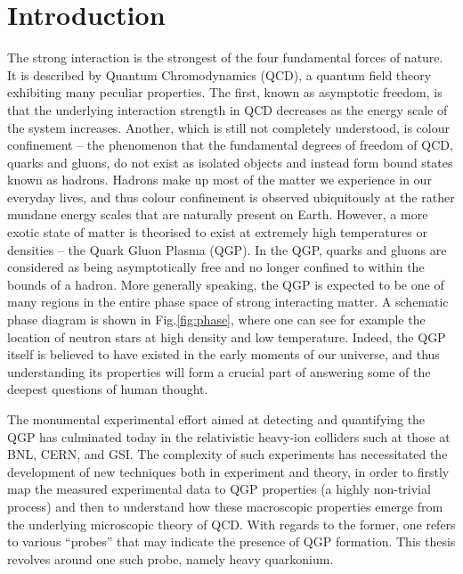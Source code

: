 \documentclass[12pt, a4paper, twoside]{book}
\begin{document}
\pagestyle{empty}



\cleardoublepage

\pagestyle{plain}



\cleardoublepage

\cleardoublepage

\tableofcontents

\cleardoublepage

\chapter{Introduction}
\onehalfspacing 
The strong interaction is the strongest of the four fundamental forces of nature. It is described by Quantum Chromodynamics (QCD), a quantum field theory exhibiting many peculiar properties. The first, known as asymptotic freedom, is that the underlying interaction strength in QCD decreases as the energy scale of the system increases. Another, which is still not completely understood, is colour confinement -- the phenomenon that the fundamental degrees of freedom of QCD, quarks and gluons, do not exist as isolated objects and instead form bound states known as hadrons. Hadrons make up most of the matter we experience in our everyday lives, and thus colour confinement is observed ubiquitously at the rather mundane energy scales that are naturally present on Earth. However, a more exotic state of matter is theorised to exist at extremely high temperatures or densities -- the Quark Gluon Plasma (QGP). In the QGP, quarks and gluons are considered as being asymptotically free and no longer confined to within the bounds of a hadron. More generally speaking, the QGP is expected to be one of many regions in the entire phase space of strong interacting matter. A schematic phase diagram is shown in Fig.\ref{fig:phase}, where one can see for example the location of neutron stars at high density and low temperature. Indeed, the QGP itself is believed to have existed in the early moments of our universe, and thus understanding its properties will form a crucial part of answering some of the deepest questions of human thought.  

The monumental experimental effort aimed at detecting and quantifying the QGP has culminated today in the relativistic heavy-ion colliders such at those at BNL, CERN, and GSI. The complexity of such experiments has necessitated the development of new techniques both in experiment and theory, in order to firstly map the measured experimental data to QGP properties (a highly non-trivial process) and then to understand how these macroscopic properties emerge from the underlying microscopic theory of QCD. With regards to the former, one refers to various ``probes'' that may indicate the presence of QGP formation. This thesis revolves around one such probe, namely heavy quarkonium.
\end{document}
